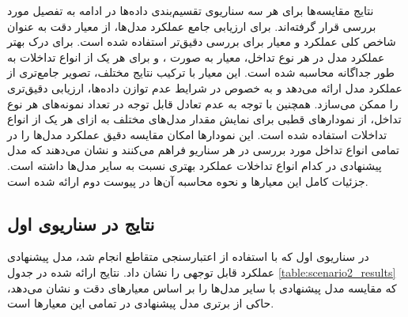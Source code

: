 نتایج مقایسه‌ها برای هر سه سناریوی تقسیم‌بندی داده‌ها در ادامه به تفصیل مورد بررسی قرار گرفته‌اند. برای ارزیابی جامع عملکرد مدل‌ها، از معیار دقت به عنوان شاخص کلی عملکرد و معیار  برای بررسی دقیق‌تر استفاده شده است. برای درک بهتر عملکرد مدل در هر نوع تداخل، معیار  به صورت ،  و  برای هر یک از انواع تداخلات به طور جداگانه محاسبه شده است. این معیار با ترکیب نتایج مختلف، تصویر جامع‌تری از عملکرد مدل ارائه می‌دهد و به خصوص در شرایط عدم توازن داده‌ها، ارزیابی دقیق‌تری را ممکن می‌سازد. همچنین با توجه به عدم تعادل قابل توجه در تعداد نمونه‌های هر نوع تداخل، از نمودارهای قطبی برای نمایش مقدار  مدل‌های مختلف به ازای هر یک از انواع تداخلات استفاده شده است. این نمودارها امکان مقایسه دقیق عملکرد مدل‌ها را در تمامی انواع تداخل مورد بررسی در هر سناریو فراهم می‌کنند و نشان می‌دهند که مدل پیشنهادی در کدام انواع تداخلات عملکرد بهتری نسبت به سایر مدل‌ها داشته است. جزئیات کامل این معیارها و نحوه محاسبه آن‌ها در پیوست دوم ارائه شده است.

\subsection{نتایج در سناریوی اول}

در سناریوی اول که با استفاده از اعتبارسنجی متقاطع  انجام شد، مدل پیشنهادی عملکرد قابل توجهی را نشان داد. نتایج ارائه شده در جدول \ref{table:scenario2_results} که مقایسه مدل پیشنهادی با سایر مدل‌ها را بر اساس معیارهای دقت و  نشان می‌دهد، حاکی از برتری مدل پیشنهادی در تمامی این معیارها است.

\begin{table}[t]
	\caption{مقایسه نتایج مدل پیشنهادی با سایر مدل‌ها در سناریوی اول}
	\label{table:scenario2_results}
	\centering %
	\renewcommand{\arraystretch}{2.5} 
\end{table}

